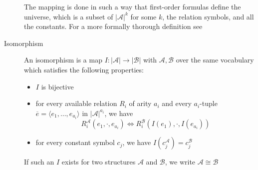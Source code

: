 \begin{description}
    The mapping is done in such a way that first-order formulas define the universe, which is a subset of $|\mathcal{A}|^k$ for some $k$, the relation symbols, and all the constants.
    For a more formally thorough definition see~\cite{descriptive-complexity}
    \item[Isomorphism] An isomorphism is a map $I: |\mathcal{A}| \to |\mathcal{B}|$ with $\mathcal{A}, \mathcal{B}$ over the same vocabulary which satisfies the following properties:
    \begin{itemize}
        \setlength\itemsep{0.2em}
        \item $I$ is bijective
        \item for every available relation $R_i$ of arity $a_i$ and every $a_i$-tuple $\overline{e} = \langle e_1, \dots, e_{a_i} \rangle$ in $|\mathcal{A}|^{a_i}$, we have \[R_i^{\mathcal{A}}(e_1, \cdot, e_{a_i}) \Leftrightarrow R_i^{\mathcal{B}}(I(e_1), \cdot, I(e_{a_i}))\]
        \item for every constant symbol $c_j$, we have $I(c_j^{\mathcal{A}}) = c_j^{\mathcal{B}}$
    \end{itemize}
    If such an $I$ exists for two structures $\mathcal{A}$ and $\mathcal{B}$, we write $\mathcal{A} \cong \mathcal{B}$
\end{description}


